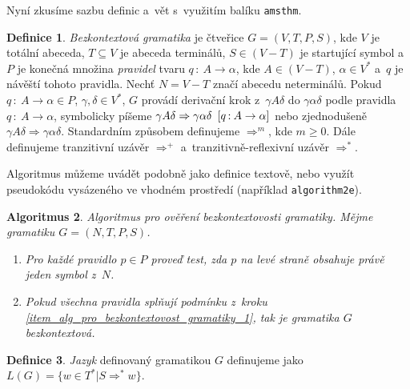\documentclass[a4paper, 11pt, twocolumn]{article}
\theoremstyle{definition}
\newtheorem{definition}{Definice}[section]
\theoremstyle{plain}
\newtheorem{algorithm}[definition]{Algoritmus}
\begin{document}
	Nyní zkusíme sazbu definic a~vět s~využitím balíku \texttt{amsthm}.

	\begin{definition}
		\label{definition_bezkontextova_gramatika}
		\emph{Bezkontextová gramatika} je čtveřice $ G = (V, T, P, S) $, kde $ V $ je totální abeceda,
		$ T \subseteq V $ je abeceda terminálů, $ S \in (V - T) $ je startující symbol a~$ P $ je
		konečná množina \emph{pravidel} tvaru $ q \, {:} \: A \rightarrow \alpha $, kde  $ A \in (V - T) $,
		$ \alpha \in V^* $ a~$ q $ je návěští tohoto pravidla. Nechť $ N = V - T $ značí abecedu neterminálů.
		Pokud $ q \, {:} \: A \rightarrow \alpha \in P $, $ \gamma, \delta \in V^* $, $ G $ provádí derivační
		krok z~$ \gamma{A}\delta $ do $ \gamma\alpha\delta $ podle pravidla
		$ q \, {:} \: A \rightarrow \alpha $, symbolicky píšeme
		$ \gamma{A}\delta \Rightarrow \gamma\alpha\delta \hspace{0.5em} [q \, {:} \: A \rightarrow \alpha] $
		nebo zjednodušeně $ \gamma{A}\delta \Rightarrow \gamma\alpha\delta $. Standardním způsobem definujeme
		$ \Rightarrow^m $, kde $ m \geq 0 $.
		Dále definujeme tranzitivní uzávěr $ \Rightarrow^+ $ a~tranzitivně-reflexivní uzávěr
		$ \Rightarrow^* $.
	\end{definition}

	Algoritmus můžeme uvádět podobně jako definice textově, nebo využít pseudokódu vysázeného ve
	vhodném prostředí (například \texttt{algorithm2e}).

	\begin{algorithm}
		Algoritmus pro ověření bezkontextovosti gramatiky. Mějme gramatiku $ G = (N, T, P, S) $.

		\begin{enumerate}
			\item{
				\label{item_alg_pro_bezkontextovost_gramatiky_1}
				Pro každé pravidlo $ p \in P $ proveď test, zda $ p $ na levé straně obsahuje právě jeden
				symbol z~$ N $.
			}

			\item{
				Pokud všechna pravidla splňují podmínku z~kroku
				\ref{item_alg_pro_bezkontextovost_gramatiky_1}, tak je gramatika $ G $ bezkontextová.
			}
		\end{enumerate}
	\end{algorithm}

	\begin{definition}
		\emph{Jazyk} definovaný gramatikou $ G $ definujeme jako $ L(G) = \{ w \in T^* | S \Rightarrow^* w \} $.
	\end{definition}
\end{document}
